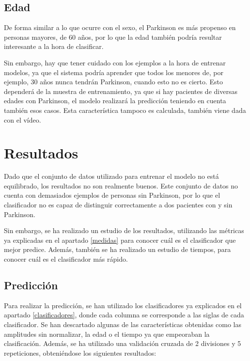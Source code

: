 \subsection{Edad}
De forma similar a lo que ocurre con el sexo, el Parkinson es más propenso en personas mayores, de 60 años, por lo que la edad también podría resultar interesante a la hora de clasificar.

Sin embargo, hay que tener cuidado con los ejemplos a la hora de entrenar modelos, ya que el sistema podría aprender que todos los menores de, por ejemplo, 30 años nunca tendrán Parkinson, cuando esto no es cierto. Esto dependerá de la muestra de entrenamiento, ya que si hay pacientes de diversas edades con Parkinson, el modelo realizará la predicción teniendo en cuenta también esos casos. Esta característica tampoco es calculada, también viene dada con el vídeo.

\section{Resultados} \label{resultados}
Dado que el conjunto de datos utilizado para entrenar el modelo no está equilibrado, los resultados no son realmente buenos. Este conjunto de datos no cuenta con demasiados ejemplos de personas sin Parkinson, por lo que el clasificador no es capaz de distinguir correctamente a dos pacientes con y sin Parkinson.

Sin embargo, se ha realizado un estudio de los resultados, utilizando las métricas ya explicadas en el apartado \ref{medidas} para conocer cuál es el clasificador que mejor predice. Además, también se ha realizado un estudio de tiempos, para conocer cuál es el clasificador más rápido.

\subsection{Predicción}
Para realizar la predicción, se han utilizado los clasificadores ya explicados en el apartado \ref{clasificadores}, donde cada columna se corresponde a las siglas de cada clasificador. Se han descartado algunas de las características obtenidas como las amplitudes sin normalizar, la edad o el tiempo ya que empeoraban la clasificación. Además, se ha utilizado una validación cruzada de 2 divisiones y 5 repeticiones, obteniéndose los siguientes resultados:

